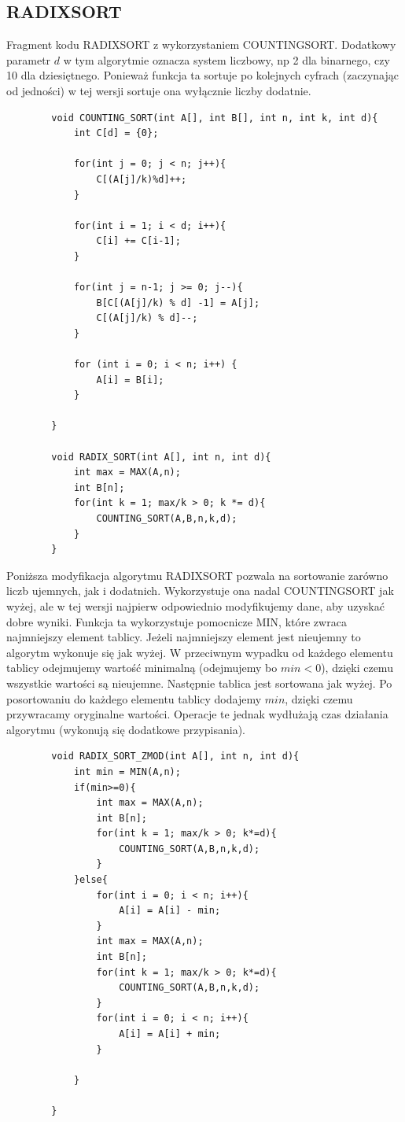 \documentclass{article}
\begin{document}
	\subsection*{RADIXSORT}
	Fragment kodu RADIXSORT z wykorzystaniem COUNTINGSORT. Dodatkowy parametr $d$ w tym algorytmie oznacza system liczbowy, np 2 dla binarnego, czy 10 dla dziesiętnego.
	Ponieważ funkcja ta sortuje po kolejnych cyfrach (zaczynając od jedności) w tej wersji sortuje ona wyłącznie liczby dodatnie.
	\begin{verbatim}
		void COUNTING_SORT(int A[], int B[], int n, int k, int d){
			int C[d] = {0};
			
			for(int j = 0; j < n; j++){
				C[(A[j]/k)%d]++;
			}
			
			for(int i = 1; i < d; i++){
				C[i] += C[i-1];
			}
			
			for(int j = n-1; j >= 0; j--){
				B[C[(A[j]/k) % d] -1] = A[j];
				C[(A[j]/k) % d]--;
			}
			
			for (int i = 0; i < n; i++) {
				A[i] = B[i];
			}
			
		}
		
		void RADIX_SORT(int A[], int n, int d){
			int max = MAX(A,n);
			int B[n];
			for(int k = 1; max/k > 0; k *= d){
				COUNTING_SORT(A,B,n,k,d);
			}
		}
	\end{verbatim}
	Poniższa modyfikacja algorytmu RADIXSORT pozwala na sortowanie zarówno liczb ujemnych, jak i dodatnich. Wykorzystuje ona nadal COUNTINGSORT jak wyżej, ale w tej wersji najpierw odpowiednio modyfikujemy dane, aby uzyskać dobre wyniki. Funkcja ta wykorzystuje pomocnicze MIN, które zwraca najmniejszy element tablicy. Jeżeli najmniejszy element jest nieujemny to algorytm wykonuje się jak wyżej. W przeciwnym wypadku od każdego elementu tablicy odejmujemy wartość minimalną (odejmujemy bo $min < 0$), dzięki czemu wszystkie wartości są nieujemne. Następnie tablica jest sortowana jak wyżej. Po posortowaniu do każdego elementu tablicy dodajemy $min$, dzięki czemu przywracamy oryginalne wartości. Operacje te jednak wydłużają czas działania algorytmu (wykonują się dodatkowe przypisania).
	\begin{verbatim}
		void RADIX_SORT_ZMOD(int A[], int n, int d){
			int min = MIN(A,n);
			if(min>=0){
				int max = MAX(A,n);
				int B[n];
				for(int k = 1; max/k > 0; k*=d){
					COUNTING_SORT(A,B,n,k,d);
				}
			}else{
				for(int i = 0; i < n; i++){
					A[i] = A[i] - min;
				}
				int max = MAX(A,n);
				int B[n];
				for(int k = 1; max/k > 0; k*=d){
					COUNTING_SORT(A,B,n,k,d);
				}
				for(int i = 0; i < n; i++){
					A[i] = A[i] + min;
				}
				
			}
			
		}
		
	\end{verbatim}
	
\end{document}
